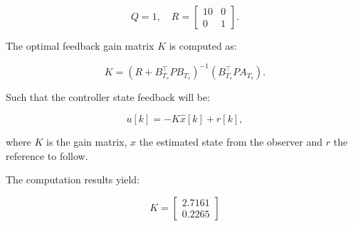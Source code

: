 \[
Q = 1, \quad
R = \begin{bmatrix}
10 & 0 \\
0 & 1
\end{bmatrix}.
\]

The optimal feedback gain matrix \( K \) is computed as:

\[
K = \left( R + B_{T_s}^\top P B_{T_s} \right)^{-1} \left(B_{T_s}^\top P A_{T_s} \right).
\]

Such that the controller state feedback will be:

\[
u[k] = -K \hat{x}[k] + r[k],
\]

where \( K \) is the gain matrix, $\hat{x}$ the estimated state from the observer and $r$ the reference to follow.

The computation results yield:

\[
K = \begin{bmatrix}
    2.7161 \\ 0.2265
\end{bmatrix}
\]
